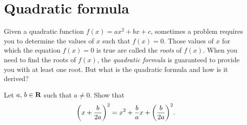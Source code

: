 \documentclass[a4paper,oneside,12pt]{article}
\begin{document}

\section{Quadratic formula}
\label{sec:quadratic_formula}

Given a quadratic function $f(x) = ax^2 + bx + c$, sometimes a problem
requires you to determine the values of $x$ such that $f(x) = 0$.
Those values of $x$ for which the equation $f(x) = 0$ is true are
called the \emph{roots} of $f(x)$.  When you need to find the roots of
$f(x)$, the \emph{quadratic formula} is guaranteed to provide you with
at least one root.  But what is the quadratic formula and how is it
derived?

\begin{exercise}
\label{ex:completing_the_square}
Let ${a},\, {b} \in \mathbf{R}$ such that $a \neq 0$.  Show that
\[
\parenthesis*{x + \frac{b}{2a}}^2
=
x^2 + \frac{b}{a} x + \parenthesis*{\frac{b}{2a}}^2.
\]
\end{exercise}
\end{document}
